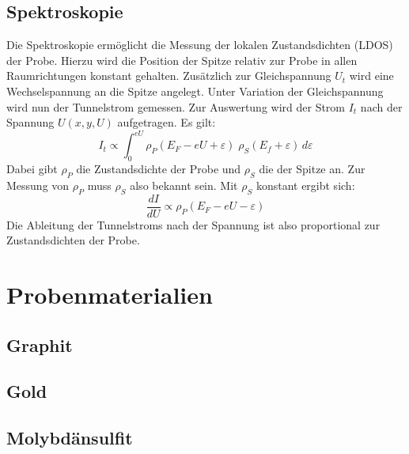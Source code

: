     \subsection{Spektroskopie}

Die Spektroskopie ermöglicht die Messung der lokalen Zustandsdichten (LDOS) der
Probe. Hierzu wird die Position der Spitze relativ zur Probe in allen Raumrichtungen
konstant gehalten. Zusätzlich zur Gleichspannung $U_t$ wird eine Wechselspannung an 
die Spitze angelegt. Unter Variation der Gleichspannung wird nun der Tunnelstrom
gemessen. Zur Auswertung wird der Strom $I_t$ nach der Spannung $U(x,y,U)$ 
aufgetragen. Es gilt:
\[
    I_t \propto \int_0^{eU} \rho_P (E_F - eU + \varepsilon) \; 
                            \rho_S (E_f + \varepsilon) \, d \varepsilon
\]
Dabei gibt $\rho_P$ die Zustandsdichte der Probe und $\rho_S$ die der Spitze an.
Zur Messung von $\rho_P$ muss $\rho_S$ also bekannt sein. Mit $\rho_S$ konstant
ergibt sich:
\[
    \frac{dI}{dU} \propto \rho_P (E_F - eU - \varepsilon)
\]
Die Ableitung der Tunnelstroms nach der Spannung ist also proportional zur 
Zustandsdichten der Probe. 
\cite{beschr}

\section{Probenmaterialien}
    \subsection{Graphit}
    \subsection{Gold}
    \subsection{Molybdänsulfit}